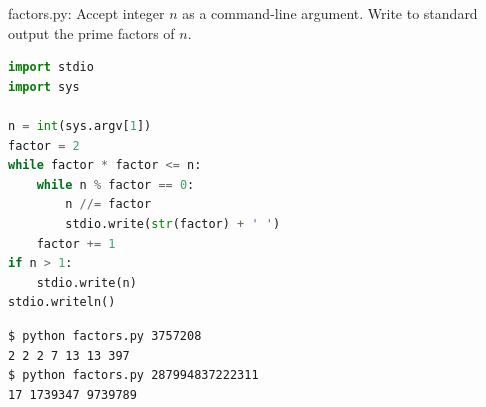\documentclass[8pt,a4paper,compress]{beamer}
\begin{document}
\begin{frame}[fragile]
\pause

\begin{framed}
\tiny factors.py: Accept integer $n$ as a command-line argument. Write to standard output the prime factors of $n$.
\end{framed}

\begin{lstlisting}[language=Python]
import stdio
import sys

n = int(sys.argv[1])
factor = 2
while factor * factor <= n:
    while n % factor == 0:
        n //= factor
        stdio.write(str(factor) + ' ')
    factor += 1
if n > 1:
    stdio.write(n)
stdio.writeln()
\end{lstlisting}

\pause

\begin{lstlisting}[language={}]
$ python factors.py 3757208
2 2 2 7 13 13 397
$ python factors.py 287994837222311
17 1739347 9739789
\end{lstlisting}
\end{frame}
\end{document}
